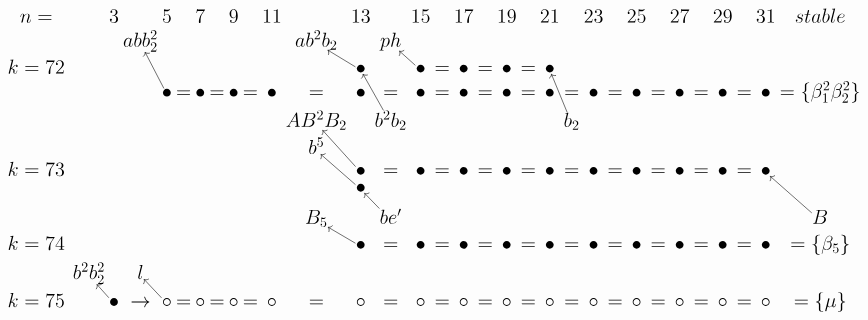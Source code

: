 \documentclass{article}
\begin{document}
\(
\begin{tikzcd}[
nodes={font=\Large,inner sep=0pt},
row sep=0.2cm,
column sep=0.1cm
]
n= && & 3 & & 5 & & 7 & & 9 & & 11 & & 13 & & 15 & & 17 && 19 && 21 && 23 && 25 && 27 && 29 && 31 & stable \\
&& && abb_2^2 && && && && ab^2b_2 && ph  \\
k=72 &&& && && && && && \bullet\arrow[lu] && \bullet\arrow[lu] &=& \bullet &=& \bullet &=& \bullet  \\
&&& && \bullet\arrow[luu] &=& \bullet &=& \bullet &=& \bullet &=& \bullet  &=& \bullet  &=& \bullet  &=& \bullet &=& \bullet  &=& \bullet &=& \bullet &=& \bullet &=& \bullet &=& \bullet & =\{\beta_1^2\beta_2^2\} \\
&& && && && && && AB^2B_2 && b^2b_2\arrow[luu] && && && && b_2\arrow[luu] \\
&& && && && && && b^5 \\
k=73 &&& && && && && && \bullet\arrow[luu] &=& \bullet  &=& \bullet  &=& \bullet &=& \bullet  &=& \bullet  &=& \bullet &=& \bullet &=& \bullet &=& \bullet  \\
& && && && && && && \bullet\arrow[luu] &&  \\ \\
&& && && && && && B_5 && be'\arrow[luu] && && && && && && && && && B\arrow[luuu] \\
k=74 &&& && && && && && \bullet\arrow[lu]  &=& \bullet  &=& \bullet &=& \bullet  &=& \bullet  &=& \bullet &=& \bullet &=& \bullet &=& \bullet &=& \bullet  & =\{\beta_5\} \\
&& b^2b_2^2 && l \\
k=75 &&& \bullet\arrow[lu] &\rightarrow& \circ\arrow[lu] &=& \circ &=& \circ &=& \circ &=& \circ &=& \circ &=& \circ &=& \circ &=& \circ &=& \circ &=& \circ &=& \circ &=& \circ &=& \circ& = \{\mu\} \\
\\
\end{tikzcd}
\)
\end{document}
